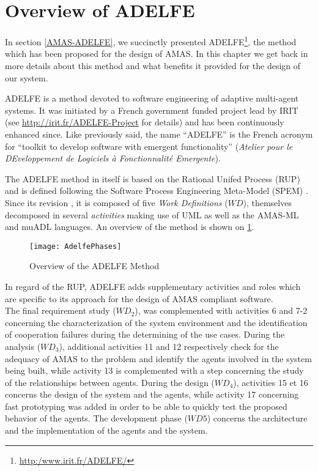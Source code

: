 \section{Overview of ADELFE}

In section \ref{AMAS-ADELFE}, we succinctly presented ADELFE\footnote{\url{http:/www.irit.fr/ADELFE/}}, the method which has been proposed for the design of AMAS. In this chapter we get back in more details about this method and what benefits it provided for the design of our system. 

ADELFE is a method devoted to software engineering of adaptive multi-agent systems. It was initiated by a French government funded project lead by IRIT (see \url{http://irit.fr/ADELFE-Project} for details) and has been continuously  enhanced since. Like previously said, the name \enquote{ADELFE} is the French acronym for \enquote{toolkit to develop software with emergent functionality} (\textit{Atelier pour le DEveloppement de Logiciels à Fonctionnalité Emergente}).

The ADELFE method in itself is based on the Rational Unifed Process (RUP) and is defined following the Software Process Engineering Meta-Model (SPEM)  \cite{PiGl2004.1,BeCaGlPi2005.1}. Since its revision \cite{Ro2008.3}, it is composed of five \emph{Work Definitions} ($WD$), themselves decomposed in several \emph{activities} making use of UML as well as the AMAS-ML and muADL languages. An overview of the method is shown on \figurename{} \ref{ADELFE_phases}.

\begin{figure}
\centering
\texttt{[image: AdelfePhases]}
\caption{Overview of the ADELFE Method}\label{ADELFE_phases}
\end{figure}

In regard of the RUP, ADELFE adds supplementary activities and roles which are specific to its approach for the design of AMAS compliant software.\\
The final requirement study ($WD_2$), was complemented with activities 6 and 7-2 concerning the characterization of the system environment and the identification of cooperation failures during the determining of the use cases. During the analysis ($WD_3$), additional activities 11 and 12 respectively check for the adequacy of AMAS to the problem and identify the agents involved in the system being built, while activity 13 is complemented with a step concerning the study of the relationships between agents. During the design ($WD_4$), activities 15 et 16 concerns the design of the system and the agents, while activity 17 concerning fast prototyping was added in order to be able to quickly test the proposed behavior of the agents. The development phase ($WD5$) concerns the architecture and the implementation of the agents and the system.

